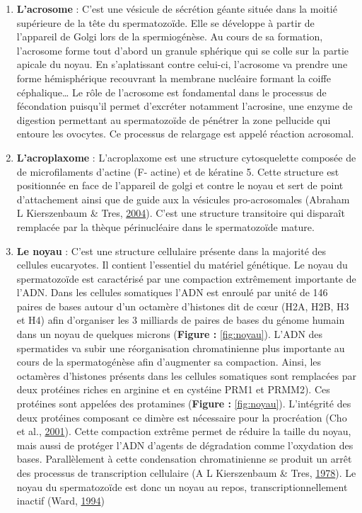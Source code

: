 \documentclass[12pt,twoside]{reedthesis}
\providecommand{\tightlist}{%
  \setlength{\itemsep}{0pt}\setlength{\parskip}{0pt}}
\theoremstyle{definition}
\theoremstyle{definition}
\theoremstyle{remark}
\begin{document}
  \begin{enumerate}
  \def\labelenumi{\arabic{enumi}.}
  \tightlist
  \item
    \textbf{L'acrosome} : C'est une vésicule de sécrétion géante située
    dans la moitié supérieure de la tête du spermatozoïde. Elle se
    développe à partir de l'appareil de Golgi lors de la spermiogénèse. Au
    cours de sa formation, l'acrosome forme tout d'abord un granule
    sphérique qui se colle sur la partie apicale du noyau. En
    s'aplatissant contre celui-ci, l'acrosome va prendre une forme
    hémisphérique recouvrant la membrane nucléaire formant la coiffe
    céphalique\ldots{} Le rôle de l'acrosome est fondamental dans le
    processus de fécondation puisqu'il permet d'excréter notamment
    l'acrosine, une enzyme de digestion permettant au spermatozoïde de
    pénétrer la zone pellucide qui entoure les ovocytes. Ce processus de
    relargage est appelé réaction acrosomal.\\
  \item
    \textbf{L'acroplaxome} : L'acroplaxome est une structure cytosquelette
    composée de de microfilaments d'actine (F- actine) et de kératine 5.
    Cette structure est positionnée en face de l'appareil de golgi et
    contre le noyau et sert de point d'attachement ainsi que de guide aux
    la vésicules pro-acrosomales (Abraham L Kierszenbaum \& Tres,
    \protect\hyperlink{ref-Kierszenbaum2004}{2004}). C'est une structure
    transitoire qui disparaît remplacée par la thèque périnucléaire dans
    le spermatozoïde mature.\\
  \item
    \textbf{Le noyau} : C'est une structure cellulaire présente dans la
    majorité des cellules eucaryotes. Il contient l'essentiel du matériel
    génétique. Le noyau du spermatozoïde est caractérisé par une
    compaction extrêmement importante de l'ADN. Dans les cellules
    somatiques l'ADN est enroulé par unité de 146 paires de bases autour
    d'un octamère d'histones dit de cœur (H2A, H2B, H3 et H4) afin
    d'organiser les 3 milliards de paires de bases du génome humain dans
    un noyau de quelques microns (\textbf{Figure : }\ref{fig:noyau}).
    L'ADN des spermatides va subir une réorganisation chromatinienne plus
    importante au cours de la spermatogénèse afin d'augmenter sa
    compaction. Ainsi, les octamères d'histones présents dans les cellules
    somatiques sont remplacées par deux protéines riches en arginine et en
    cystéine PRM1 et PRMM2). Ces protéines sont appelées des protamines
    (\textbf{Figure : }\ref{fig:noyau}). L'intégrité des deux protéines
    composant ce dimère est nécessaire pour la procréation (Cho et al.,
    \protect\hyperlink{ref-Cho2001}{2001}). Cette compaction extrême
    permet de réduire la taille du noyau, mais aussi de protéger l'ADN
    d'agents de dégradation comme l'oxydation des bases. Parallèlement à
    cette condensation chromatinienne se produit un arrêt des processus de
    transcription cellulaire (A L Kierszenbaum \& Tres,
    \protect\hyperlink{ref-Kierszenbaum1978}{1978}). Le noyau du
    spermatozoïde est donc un noyau au repos, transcriptionnellement
    inactif (Ward, \protect\hyperlink{ref-Ward1994}{1994})
  \end{enumerate}
  
\end{document}
